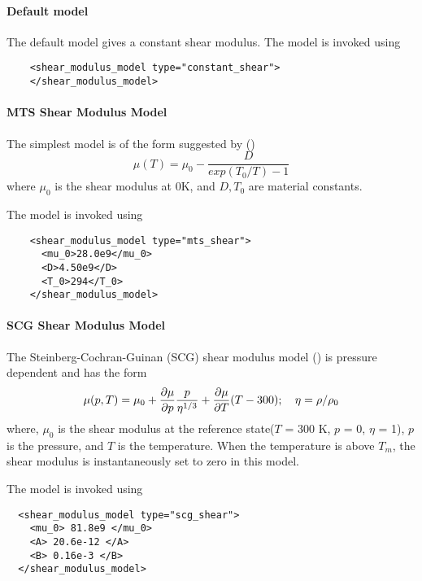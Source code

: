   \paragraph{Default model}
  The default model gives a constant shear modulus.  The model is 
  invoked using
  \lstset{language=XML}
  \begin{lstlisting}
    <shear_modulus_model type="constant_shear">
    </shear_modulus_model>
  \end{lstlisting}

  \paragraph{MTS Shear Modulus Model}
  The simplest model is of the form suggested by \cite{Varshni1970} 
  (\cite{Chen1996})
  \begin{equation} \label{eq:MTSShear}
    \mu(T) = \mu_0 - \frac{D}{exp(T_0/T) - 1}
  \end{equation}
  where $\mu_0$ is the shear modulus at 0K, and $D, T_0$ are material
  constants. 

  The model is invoked using
  \lstset{language=XML}
  \begin{lstlisting}
    <shear_modulus_model type="mts_shear">
      <mu_0>28.0e9</mu_0>
      <D>4.50e9</D>
      <T_0>294</T_0>
    </shear_modulus_model>
  \end{lstlisting}

  \paragraph{SCG Shear Modulus Model}
  The Steinberg-Cochran-Guinan (SCG) shear modulus 
  model (\cite{Steinberg1980,Zocher2000}) is pressure dependent and
  has the form
  \begin{equation} \label{eq:SCGShear}
    \mu(p,T) = \mu_0 + \frac{\displaystyle\partial \mu}{\displaystyle\partial p} \frac{p}{\eta^{1/3}} +
         \frac{\displaystyle\partial \mu}{\displaystyle\partial T}(T - 300) ; \quad
    \eta = \rho/\rho_0
  \end{equation}
  where, $\mu_0$ is the shear modulus at the reference state($T$ = 300 K, 
  $p$ = 0, $\eta$ = 1), $p$ is the pressure, and $T$ is the temperature.
  When the temperature is above $T_m$, the shear modulus is instantaneously
  set to zero in this model.

  The model is invoked using
  \lstset{language=XML}
  \begin{lstlisting}
  <shear_modulus_model type="scg_shear">
    <mu_0> 81.8e9 </mu_0>
    <A> 20.6e-12 </A>
    <B> 0.16e-3 </B>
  </shear_modulus_model>
  \end{lstlisting}

